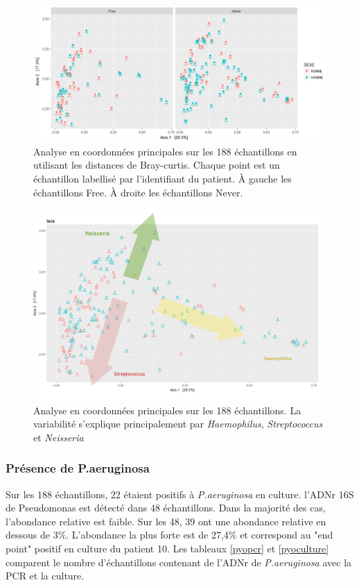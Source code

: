 \documentclass[12pt,a4paper]{article}
\begin{document}
\begin{figure}
\begin{center}
\includegraphics[scale=0.60]{img/oordination_new.png}\hfill
\end{center}
\caption{Analyse en coordonnées principales sur les 188 échantillons en utilisant les distances de Bray-curtis. Chaque point est un échantillon labellisé par l'identifiant du patient. À gauche les échantillons Free. À droite les échantillons Never. }
\label{ordination}
\end{figure}

\begin{figure}
\begin{center}
\includegraphics[scale=0.40]{img/Capture.png}\hfill
\end{center}
\caption{Analyse en coordonnées principales sur les 188 échantillons. La variabilité s'explique principalement par \textit{Haemophilus}, \textit{Streptococcus} et \textit{Neisseria}}
\label{ordination2}
\end{figure}

\subsubsection{Présence de P.aeruginosa}
Sur les 188 échantillons, 22 étaient positifs à \textit{P.aeruginosa} en culture.  l'ADNr 16S de Pseudomonas est détecté dans 48 échantillons. Dans la majorité des cas, l'abondance relative est faible. Sur les 48, 39 ont une abondance relative en dessous de 3\%. L'abondance la plus forte est de 27,4\% et correspond au "end point" positif en culture du patient 10.
Les tableaux \ref{pyopcr} et \ref{pyoculture} comparent le nombre d'échantillons contenant de l'ADNr de \textit{P.aeruginosa} avec la PCR et la culture.
\end{document}
